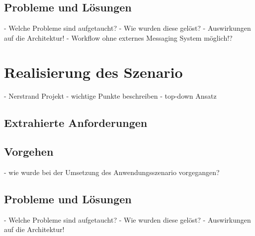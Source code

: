   
\subsection{Probleme und Lösungen} %
\label{sub:probleme_und_loesungen_architektur}

  - Welche Probleme sind aufgetaucht?
  - Wie wurden diese gelöst?
  - Auswirkungen auf die Architektur!
  - Workflow ohne externes Messaging System möglich!?



\section{Realisierung des Szenario} %
\label{sec:realisierung_des_szenario}

  - Nerstrand Projekt
  - wichtige Punkte beschreiben
  - top-down Ansatz

\subsection{Extrahierte Anforderungen} %
\label{sub:extrahierte_anforderungen}


\subsection{Vorgehen} %
\label{sub:vorgehen_szenario}

  - wie wurde bei der Umsetzung des Anwendungsszenario vorgegangen?


\subsection{Probleme und Lösungen} %
\label{sub:probleme_und_loesungen_szenario}

  - Welche Probleme sind aufgetaucht?
  - Wie wurden diese gelöst?
  - Auswirkungen auf die Architektur!



